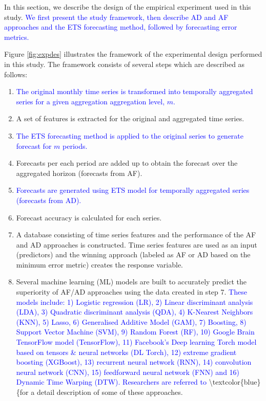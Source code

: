 \documentclass[preprint, 3p,
authoryear]{elsarticle} %
\begin{document}
In this section, we describe the design of the empirical experiment used
in this study.
\textcolor{blue}{We first present the study framework, then describe AD and AF approaches and the ETS forecasting method, followed by forecasting error metrics.}

Figure \ref{fig:expdes} illustrates the framework of the experimental
design performed in this study. The framework consists of several steps
which are described as follows:

\begin{enumerate}
\def\labelenumi{\arabic{enumi}.}
\item
  \textcolor{blue}{The original monthly time series is transformed into temporally aggregated series for a given aggregation aggregation level, $m$.}
\item
  A set of features is extracted for the original and aggregated time
  series.
\item
  \textcolor{blue}{The ETS forecasting method is applied to the original series to generate forecast for $m$ periods.}
\item
  Forecasts per each period are added up to obtain the forecast over the
  aggregated horizon (forecasts from AF).
\item
  \textcolor{blue}{Forecasts are generated using ETS model for temporally aggregated series (forecasts from AD).}
\item
  Forecast accuracy is calculated for each series.
\item
  A database consisting of time series features and the performance of
  the AF and AD approaches is constructed. Time series features are used
  as an input (predictors) and the winning approach (labeled as AF or AD
  based on the minimum error metric) creates the response variable.
\item
  Several machine learning (ML) models are built to accurately predict
  the superiority of AF/AD approaches using the data created in step 7.
  \textcolor{blue}{These models include: 1) Logistic regression (LR), 2) Linear discriminant analysis (LDA), 3) Quadratic discriminant analysis (QDA), 4) K-Nearest Neighbors (KNN), 5) Lasso, 6) Generalised Additive Model (GAM), 7) Boosting, 8) Support Vector Machine (SVM), 9) Random Forest (RF), 10) Google Brain TensorFlow model (TensorFlow), 11) Facebook's Deep learning Torch model based on tensors \& neural networks (DL Torch), 12) extreme gradient boosting (XGBoost), 13) recurrent neural network (RNN), 14) convolution neural network (CNN), 15) feedforward neural network (FNN) and 16) Dynamic Time Warping (DTW). Researchers are referred to}
  \citet{james2021statistical} \textbackslash textcolor\{blue\}\{for a
  detail description of some of these approaches.
\end{enumerate}
\end{document}
